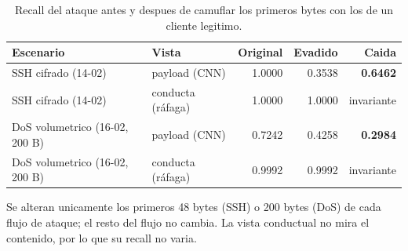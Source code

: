 \begin{table}[htbp]
  \centering
  \caption{Recall del ataque antes y despues de camuflar los primeros bytes con los de un cliente legitimo.}
  \label{tab:evasión}
  \small
  \begin{tabular}{llrrr}
    \toprule
    \textbf{Escenario} & \textbf{Vista} & \textbf{Original} & \textbf{Evadido} & \textbf{Caida} \\
    \midrule
    SSH cifrado (14-02) & payload (CNN) & 1.0000 & 0.3538 & \textbf{0.6462} \\
    SSH cifrado (14-02) & conducta (ráfaga) & 1.0000 & 1.0000 & invariante \\
    DoS volumetrico (16-02, 200 B) & payload (CNN) & 0.7242 & 0.4258 & \textbf{0.2984} \\
    DoS volumetrico (16-02, 200 B) & conducta (ráfaga) & 0.9992 & 0.9992 & invariante \\
    \bottomrule
  \end{tabular}
  \par\smallskip\footnotesize{Se alteran unicamente los primeros 48 bytes (SSH) o 200 bytes (DoS) de cada flujo de ataque; el resto del flujo no cambia. La vista conductual no mira el contenido, por lo que su recall no varia.}
\end{table}

